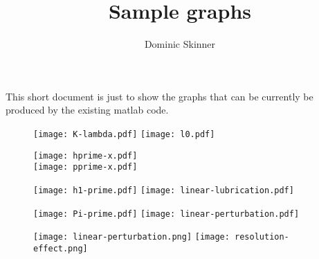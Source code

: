 \documentclass{article}
\begin{document}
\title{Sample graphs}
\author{Dominic Skinner}
\maketitle
This short document is just to show the graphs that can be
currently be produced by the existing matlab code. 
\begin{figure}[ht]\centering
\texttt{[image: K-lambda.pdf]}
\texttt{[image: l0.pdf]}
\end{figure}
%
\begin{figure}[!ht]\centering
\texttt{[image: hprime-x.pdf]}
\\[8pt]
\texttt{[image: pprime-x.pdf]}
\end{figure}
%
\begin{figure}[!ht]\centering
\texttt{[image: h1-prime.pdf]}
\texttt{[image: linear-lubrication.pdf]}
\end{figure}
%
\begin{figure}[!ht]\centering
\texttt{[image: Pi-prime.pdf]}
\texttt{[image: linear-perturbation.pdf]}
\end{figure}
\begin{figure}[!ht]\centering
\texttt{[image: linear-perturbation.png]}
\texttt{[image: resolution-effect.png]}
\end{figure}
\end{document}

